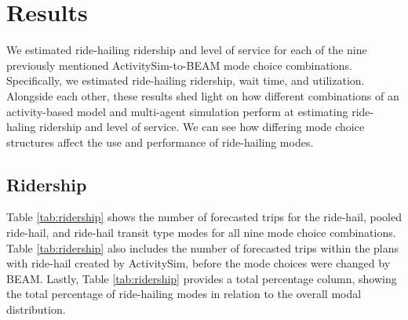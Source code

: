\documentclass[simple, masters, twoside]{byuthesis}
\begin{document}
\hypertarget{results}{%
\chapter{Results}\label{results}}

We estimated ride-hailing ridership and level of service for each of the nine previously mentioned ActivitySim-to-BEAM mode choice combinations. Specifically, we estimated ride-hailing ridership, wait time, and utilization. Alongside each other, these results shed light on how different combinations of an activity-based model and multi-agent simulation perform at estimating ride-haling ridership and level of service. We can see how differing mode choice structures affect the use and performance of ride-hailing modes.

\hypertarget{res-ridership}{%
\section{Ridership}\label{res-ridership}}

Table \ref{tab:ridership} shows the number of forecasted trips for the ride-hail, pooled ride-hail, and ride-hail transit type modes for all nine mode choice combinations. Table \ref{tab:ridership} also includes the number of forecasted trips within the plans with ride-hail created by ActivitySim, before the mode choices were changed by BEAM. Lastly, Table \ref{tab:ridership} provides a total percentage column, showing the total percentage of ride-hailing modes in relation to the overall modal distribution.
\end{document}
